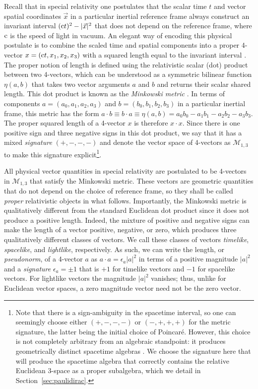 \documentclass[1p,sort&compress]{elsarticle}
\numberwithin{equation}{section}
\newcommand{\rv}[1]{\vec{#1}}
\newcommand{\cc}{{\rm c}}
\begin{document}
Recall that in special relativity \cite{Einstein1905} one postulates that the scalar time $t$ and vector spatial coordinates $\rv{x}$ in a particular inertial reference frame always construct an invariant interval $(\cc t)^2 - |\rv{x}|^2$ that does not depend on the reference frame, where $\cc$ is the speed of light in vacuum.  An elegant way of encoding this physical postulate is to combine the scaled time and spatial components into a proper 4-vector $x = (\cc t,x_1,x_2,x_3)$ with a squared length equal to the invariant interval \cite{Poincare1905,Poincare1906,Minkowski1907}.  The proper notion of length is defined using the relativistic scalar (dot) product between two 4-vectors, which can be understood as a symmetric bilinear function $\eta(a,b)$ that takes two vector arguments $a$ and $b$ and returns their scalar shared length.  This dot product is known as the \emph{Minkowski metric} \cite{Minkowski1908}.  In terms of components $a = (a_0,a_1,a_2,a_3)$ and $b = (b_0,b_1,b_2,b_3)$ in a particular inertial frame, this metric has the form $a\cdot b \equiv b\cdot a \equiv \eta(a,b) = a_0 b_0 - a_1 b_1 - a_2 b_2 - a_3 b_3$.  The proper squared length of a 4-vector $x$ is therefore $x \cdot x$.  Since there is one positive sign and three negative signs in this dot product, we say that it has a mixed \emph{signature} $(+,-,-,-)$  and denote the vector space of 4-vectors as $\mathcal{M}_{1,3}$ to make this signature explicit\footnote{Note that there is a sign-ambiguity in the spacetime interval, so one can seemingly choose either $(+,-,-,-)$ or $(-,+,+,+)$ for the metric signature, the latter being the initial choice of Poincar\'e.  However, this choice is not completely arbitrary from an algebraic standpoint: it produces geometrically distinct spacetime algebras \cite{Crumeyrolle1990}.  We choose the signature here that will produce the spacetime algebra that correctly contains the relative Euclidean 3-space as a proper subalgebra, which we detail in Section~\ref{sec:paulidirac}.}.

All physical vector quantities in special relativity are postulated to be 4-vectors in $\mathcal{M}_{1,3}$ that satisfy the Minkowski metric.  These vectors are geometric quantities that do not depend on the choice of reference frame, so they shall be called \emph{proper} relativistic objects in what follows.  Importantly, the Minkowski metric is qualitatively different from the standard Euclidean dot product since it does not produce a positive length.  Indeed, the mixture of positive and negative signs can make the length of a vector positive, negative, or zero, which produces three qualitatively different classes of vectors.  We call these classes of vectors \emph{timelike}, \emph{spacelike}, and \emph{lightlike}, respectively.  As such, we can write the length, or \emph{pseudonorm}, of a 4-vector $a$ as $a\cdot a = \epsilon_a |a|^2$ in terms of a positive magnitude $|a|^2$ and a \emph{signature} $\epsilon_a = \pm 1$ that is $+1$ for timelike vectors and $-1$ for spacelike vectors.  For lightlike vectors the magnitude $|a|^2$ vanishes; thus, unlike for Euclidean vector spaces, a zero magnitude vector need not be the zero vector.
\end{document}
